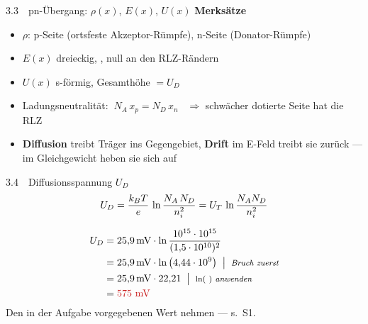 \begin{RezeptA}{3.3\ \ pn-Übergang: $\rho(x)$, $E(x)$, $U(x)$ \hfill
  }
\textbf{Merksätze}
\begin{itemize}
\item $\rho$: p-Seite  (ortsfeste Akzeptor-Rümpfe),
      n-Seite  (Donator-Rümpfe)
\item $E(x)$ dreieckig, , null an den
      RLZ-Rändern
\item $U(x)$ s-förmig, Gesamthöhe $=U_D$
\item Ladungsneutralität: $\ N_A\,x_p=N_D\,x_n$ \ $\Rightarrow$
      schwächer dotierte Seite hat die  RLZ
\item \textbf{Diffusion} treibt Träger ins Gegengebiet,
      \textbf{Drift} im E-Feld treibt sie zurück — im Gleichgewicht
      heben sie sich auf
\end{itemize}
\end{RezeptA}

\begin{RezeptA}{3.4\ \ Diffusionsspannung $U_D$ \hfill {}}
\[ U_D=\frac{k_B T}{e}\,\ln\frac{N_A\,N_D}{n_i^{2}}
   = U_{T}\,\ln\frac{N_A N_D}{n_i^{2}} \]

\Beispiel[$N_A=N_D=10^{15}\,\mathrm{cm^{-3}}$]
\begin{align*}
U_D &= 25{,}9\,\mathrm{mV}\cdot\ln
       \frac{10^{15}\cdot10^{15}}{(1{,}5\cdot10^{10})^{2}}\\
 &= 25{,}9\,\mathrm{mV}\cdot\ln\left(4{,}44\cdot10^{9}\right)
    \notat{Bruch zuerst}\\
 &= 25{,}9\,\mathrm{mV}\cdot22{,}21
    \notat{$\ln(\ )$ anwenden}\\
 &= \erg{575\ \mathrm{mV}}
\end{align*}
 Den in der Aufgabe
vorgegebenen Wert nehmen — s.\ S1.
\end{RezeptA}

